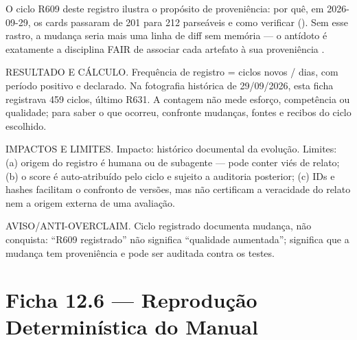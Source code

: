 O ciclo R609 deste registro ilustra o propósito de proveniência: por quê, em
2026-09-29, os cards passaram de 201 para 212 parseáveis e como verificar
(). Sem esse rastro, a mudança seria mais uma linha de diff
sem memória — o antídoto é exatamente a disciplina FAIR de associar cada
artefato à sua proveniência .\begin{resultado}
RESULTADO E CÁLCULO. Frequência de registro = ciclos novos / dias,
com período positivo e declarado. Na fotografia histórica de 29/09/2026,
esta ficha registrava 459 ciclos, último R631. A contagem não mede esforço,
competência ou qualidade; para saber o que ocorreu, confronte mudanças,
fontes e recibos do ciclo escolhido.
\end{resultado}

\begin{limite}
IMPACTOS E LIMITES. Impacto: histórico documental da evolução. Limites: (a)
origem do registro é humana ou de subagente — pode conter viés de relato; (b)
o score é auto-atribuído pelo ciclo e sujeito a auditoria posterior; (c)
IDs e hashes facilitam o confronto de versões, mas não certificam a
veracidade do relato nem a origem externa de uma avaliação.
\end{limite}

\begin{aviso}
AVISO/ANTI-OVERCLAIM. Ciclo registrado documenta mudança, não conquista:
``R609 registrado'' não significa ``qualidade aumentada''; significa que a
mudança tem proveniência e pode ser auditada contra os testes.
\end{aviso}

\section{Ficha 12.6 — Reprodução Determinística do Manual}


